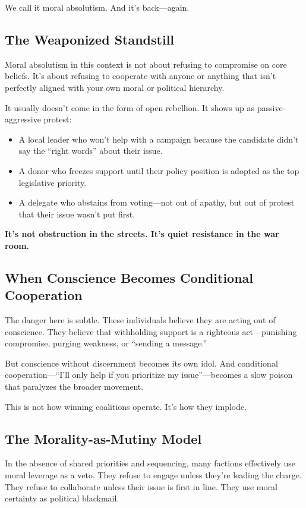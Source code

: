 We call it moral absolutism. And it’s back—again.

\subsection*{The Weaponized Standstill}

Moral absolutism in this context is not about refusing to compromise on core beliefs. It’s about refusing to cooperate with anyone or anything that isn’t perfectly aligned with your own moral or political hierarchy.

It usually doesn’t come in the form of open rebellion. It shows up as passive-aggressive protest:
\begin{itemize}
    \item A local leader who won’t help with a campaign because the candidate didn’t say the “right words” about their issue.
    \item A donor who freezes support until their policy position is adopted as the top legislative priority.
    \item A delegate who abstains from voting—not out of apathy, but out of protest that their issue wasn’t put first.
\end{itemize}

\textbf{It’s not obstruction in the streets. It’s quiet resistance in the war room.}

\subsection*{When Conscience Becomes Conditional Cooperation}

The danger here is subtle. These individuals believe they are acting out of conscience. They believe that withholding support is a righteous act—punishing compromise, purging weakness, or “sending a message.”

But conscience without discernment becomes its own idol. And conditional cooperation—“I’ll only help if you prioritize my issue”—becomes a slow poison that paralyzes the broader movement.

This is not how winning coalitions operate. It’s how they implode.

\subsection*{The Morality-as-Mutiny Model}

In the absence of shared priorities and sequencing, many factions effectively use moral leverage as a veto. They refuse to engage unless they’re leading the charge. They refuse to collaborate unless their issue is first in line. They use moral certainty as political blackmail.

